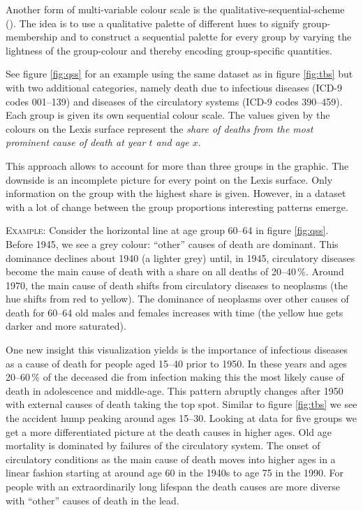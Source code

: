 \documentclass[a4paper, 12pt]{scrartcl}
\begin{document}
Another form of multi-variable colour scale is the qualitative-sequential-scheme (\cite{Brewer1994a}). The idea is to use a qualitative palette of different hues to signify group-membership and to construct a sequential palette for every group by varying the lightness of the group-colour and thereby encoding group-specific quantities.

See figure \ref{fig:qss} for an example using the same dataset as in figure \ref{fig:tbs} but with two additional categories, namely death due to infectious diseases (ICD-9 codes 001--139) and diseases of the circulatory systems (ICD-9 codes 390--459). Each group is given its own sequential colour scale. The values given by the colours on the Lexis surface represent the \emph{share of deaths from the most prominent cause of death at year $t$ and age $x$}.

This approach allows to account for more than three groups in the graphic. The downside is an incomplete picture for every point on the Lexis surface. Only information on the group with the highest share is given. However, in a dataset with a lot of change between the group proportions interesting patterns emerge.

\textsc{Example:} Consider the horizontal line at age group 60--64 in figure \ref{fig:qss}. Before 1945, we see a grey colour: \enquote{other} causes of death are dominant. This dominance declines about 1940 (a lighter grey) until, in 1945, circulatory diseases become the main cause of death with a share on all deaths of 20--40\,\%. Around 1970, the main cause of death shifts from circulatory diseases to neoplasms (the hue shifts from red to yellow). The dominance of neoplasms over other causes of death for 60--64 old males and females increases with time (the yellow hue gets darker and more saturated).

One new insight this visualization yields is the importance of infectious diseases as a cause of death for people aged 15--40 prior to 1950. In these years and ages 20--60\,\% of the deceased die from infection making this the most likely cause of death in adolescence and middle-age. This pattern abruptly changes after 1950 with external causes of death taking the top spot. Similar to figure \ref{fig:tbs} we see the accident hump peaking around ages 15--30. Looking at data for five groups we get a more differentiated picture at the death causes in higher ages. Old age mortality is dominated by failures of the circulatory system. The onset of circulatory conditions as the main cause of death moves into higher ages in a linear fashion starting at around age 60 in the 1940s to age 75 in the 1990. For people with an extraordinarily long lifespan the death causes are more diverse with \enquote{other} causes of death in the lead.
\end{document}
